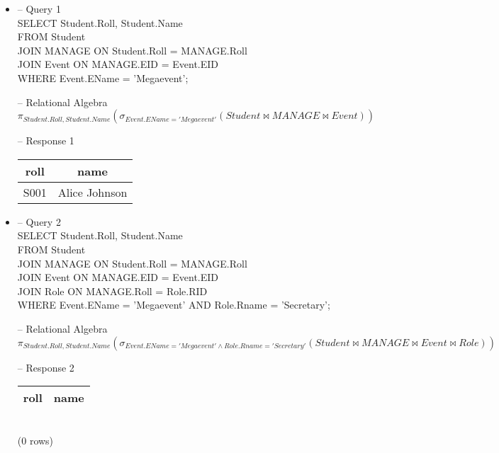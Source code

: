\documentclass[7pt]{article}
\begin{document}
\begin{itemize}
    \item -- Query 1 \\
    SELECT Student.Roll, Student.Name   \\
    FROM Student    \\
    JOIN MANAGE ON Student.Roll = MANAGE.Roll   \\
    JOIN Event ON MANAGE.EID = Event.EID    \\
    WHERE Event.EName = 'Megaevent';    \vspace{2pt}

    -- Relational Algebra \\
    $\pi_{Student.Roll, Student.Name}(\sigma_{Event.EName = 'Megaevent'}(Student \bowtie MANAGE \bowtie Event))$ \vspace{2pt}
    
    -- Response 1 \\
    \begin{tabular}{|c|c|}
        \hline
        roll & name \\
        \hline
        S001 & Alice Johnson \\
        \hline
    \end{tabular}

    \item -- Query 2 \\
    SELECT Student.Roll, Student.Name   \\
    FROM Student    \\
    JOIN MANAGE ON Student.Roll = MANAGE.Roll   \\
    JOIN Event ON MANAGE.EID = Event.EID    \\
    JOIN Role ON MANAGE.Roll = Role.RID \\
    WHERE Event.EName = 'Megaevent' AND Role.Rname = 'Secretary'; \vspace{2pt}

    -- Relational Algebra \\
    $\pi_{Student.Roll, Student.Name}(\sigma_{Event.EName = 'Megaevent' \wedge Role.Rname = 'Secretary'}(Student \bowtie MANAGE \bowtie Event \bowtie Role))$ \vspace{2pt}
    
    -- Response 2 \\
    \begin{tabular}{|c|c|}
        \hline
        roll & name \\
        \hline
    \end{tabular} \\
    (0 rows)


\end{itemize}
\end{document}
